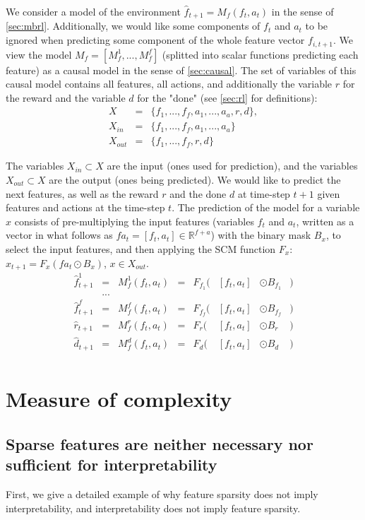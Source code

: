 \documentclass[a4paper,11pt,oneside]{report}
\begin{document}
We consider a model of the environment $\hat{f}_{t+1}=M_f(f_t,a_t)$ in the sense of \autoref{sec:mbrl}. Additionally, we would like some components of $f_t$ and $a_t$ to be ignored when predicting some component of the whole feature vector $f_{i,t+1}$. We view the model $M_f=[M_f^1,...,M_f^f]$ (splitted into scalar functions predicting each feature) as a causal model in the sense of \autoref{sec:causal}. The set of variables of this causal model contains all features, all actions, and additionally the variable $r$ for the reward and the variable $d$ for the "done" (see \autoref{sec:rl} for definitions):
$$
\begin{array}{lcl}
X&=&\{f_1,...,f_f,a_1,...,a_a,r,d\},\\
X_{in}&=&\{f_1,...,f_f,a_1,...,a_a\}\\
X_{out}&=&\{f_1,...,f_f,r,d\}
\end{array}
$$

The variables $X_{in}\subset X$ are the input (ones used for prediction), and the variables $X_{out}\subset X$ are the output (ones being predicted).
We would like to predict the next features, as well as the reward $r$ and the done $d$ at time-step $t+1$ given features and actions at the time-step $t$. The prediction of the model for a variable $x$ consists of pre-multiplying the input features (variables $f_t$ and $a_t$, written as a vector in what follows as $fa_t=[f_t,a_t]\in\mathbb R^{f+a}$) with the binary mask $B_x$, to select the input features, and then applying the SCM function $F_x$: $x_{t+1}=F_x(fa_t\odot B_x)$, $x\in X_{out}$.
$$
\begin{array}{lcllrllr}
\hat{f}_{t+1}^1&=&M_f^1(f_t,a_t)&=&F_{f_1}(&[f_t,a_t]&\odot B_{f_1}&)\\
&...&\\
\hat{f}_{t+1}^f&=&M_f^f(f_t,a_t)&=&F_{f_f}(&[f_t,a_t]&\odot B_{f_f}&)\\
\hat{r}_{t+1}&=&M_f^r(f_t,a_t)&=&F_{r}(&[f_t,a_t]&\odot B_{r}&)\\
\hat{d}_{t+1}&=&M_f^d(f_t,a_t)&=&F_{d}(&[f_t,a_t]&\odot B_{d}&)\\
\end{array}
$$

\section{Measure of complexity}

\subsection{Sparse features are neither necessary nor sufficient for interpretability}
First, we give a detailed example of why feature sparsity does not imply interpretability, and interpretability does not imply feature sparsity.
\end{document}
